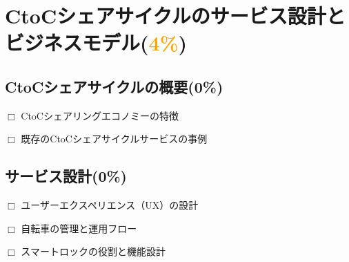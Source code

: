 \section{CtoCシェアサイクルのサービス設計とビジネスモデル(\textcolor{orange}{4\%})}
  \label{sec:CtoCシェアサイクルのサービス設計とビジネスモデル}
  
  \subsection{CtoCシェアサイクルの概要(0\%)}
    \label{sec:CtoCシェアサイクルの概要}
      \par $\Box$ CtoCシェアリングエコノミーの特徴
      \par $\Box$ 既存のCtoCシェアサイクルサービスの事例
      
  \subsection{サービス設計(0\%)}
    \label{sec:サービス設計}
      \par $\Box$ ユーザーエクスペリエンス（UX）の設計
      \par $\Box$ 自転車の管理と運用フロー
      \par $\Box$ スマートロックの役割と機能設計

